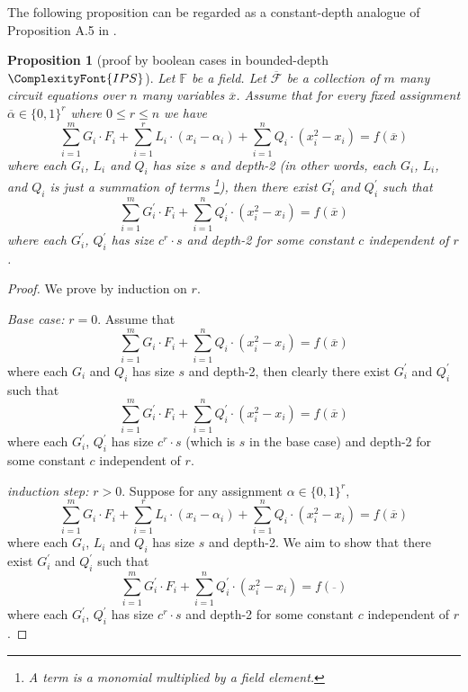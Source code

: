 \documentclass[11pt,letter]{article}
\newtheorem{proposition}[theorem]{Proposition}
\theoremstyle{remark} %
\newcommand{\IPS}{%
    {
        \ComplexityFont{IPS} 
    }
}
\newcommand{\F}{\mathbb{F}}
\begin{document}
{    The following proposition can be regarded as a constant-depth analogue of Proposition A.5 in \cite{AGHT24}.

    \begin{proposition}[proof by boolean cases in bounded-depth $\IPS$]
        \label{prop: 0-1 implication completeness of IPS}
        Let $\F$ be a field. Let $\overline{\mathcal{F}}$ be a collection of $m$ many circuit equations over $n$ many variables $\overline{x}$. Assume that for every fixed assignment $\overline{\alpha} \in \{0,1\}^r$ where $0 \leq r \leq n$ we have 
        \[
            \sum_{i=1}^m G_i \cdot F_i + \sum_{i=1}^r L_i \cdot (x_i - \alpha_i) + \sum_{i=1}^n Q_i \cdot (x_i^2 -x_i)  = f(\overline{x})
        \]
        where each $G_i$, $L_i$ and $Q_i$ has size $s$ and depth-2 (in other words, each $G_i$, $L_i$, and $Q_i$ is just a summation of terms%
        \footnote{A term is a monomial multiplied by a field element.}), then there exist $G_i^\prime$ and $Q_i^\prime$ such that
        \[
            \sum_{i=1}^m G_i^\prime \cdot F_i + \sum_{i=1}^n Q_i^\prime \cdot (x_i^2 -x_i) = f(\overline{x})
        \]
        where each $G_i^\prime$, $Q_i^\prime$ has size $c^r \cdot s$ and depth-2 for some constant $c$ independent of $r$.
    \end{proposition}

    \begin{proof}
        We prove by induction on $r$.

        \emph{Base case:} $r=0$. Assume that 
        \[
            \sum_{i=1}^m G_i \cdot F_i + \sum_{i=1}^n Q_i \cdot (x_i^2 -x_i)  = f(\overline{x})
        \]
        where each $G_i$ and $Q_i$ has size $s$ and depth-2, then clearly there exist $G_i^\prime$ and $Q_i^\prime$ such that
        \[
            \sum_{i=1}^m G_i^\prime \cdot F_i + \sum_{i=1}^n Q_i^\prime \cdot (x_i^2 -x_i) = f(\overline{x})
        \]
        where each $G_i^\prime$, $Q_i^\prime$ has size $c^r \cdot s$ (which is $s$ in the base case) and depth-2 for some constant $c$ independent of $r$.
        

        \emph{induction step:} $r > 0$. Suppose for any assignment $\alpha \in \{0,1\}^r$, 
        \[
            \sum_{i=1}^m G_i \cdot F_i + \sum_{i=1}^r L_i \cdot (x_i - \alpha_i) + \sum_{i=1}^n Q_i \cdot (x_i^2 -x_i)  = f(\overline{x})
        \]
        where each $G_i$, $L_i$ and $Q_i$ has size $s$ and depth-2. We aim to show that there exist $G_i^\prime$ and $Q_i^\prime$ such that
        \[
            \sum_{i=1}^m G_i^\prime \cdot F_i + \sum_{i=1}^n Q_i^\prime \cdot (x_i^2 -x_i) = f(\overline{})
        \]
        where each $G_i^\prime$, $Q_i^\prime$ has size $c^r \cdot s$ and depth-2 for some constant $c$ independent of $r$.


\end{proof}}
\end{document}
